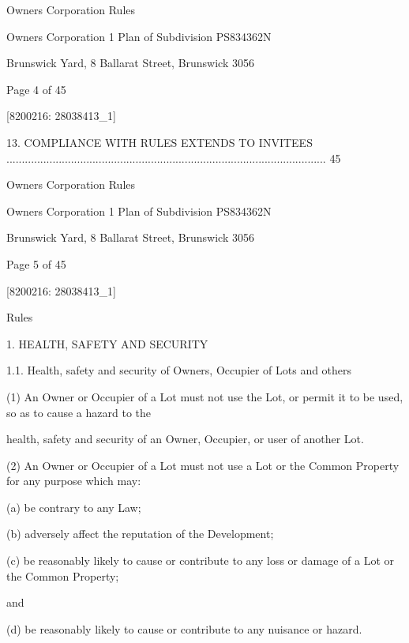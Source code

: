 \documentclass{article}
\begin{document}
{\fontsize{9}{1}Owners Corporation Rules }

{\fontsize{9}{1}Owners Corporation 1 Plan of Subdivision PS834362N }

{\fontsize{9}{1}Brunswick Yard, 8 Ballarat Street, Brunswick 3056 }


{\fontsize{9}{1}Page 4  of 45 }



{\fontsize{7.02}{1}[8200216: 28038413\_1] }

{\fontsize{9.99}{1}13. COMPLIANCE WITH RULES EXTENDS TO INVITEES ........................................................................................................ 45 }

\newpage





{\fontsize{9}{1}Owners Corporation Rules }

{\fontsize{9}{1}Owners Corporation 1 Plan of Subdivision PS834362N }

{\fontsize{9}{1}Brunswick Yard, 8 Ballarat Street, Brunswick 3056 }


{\fontsize{9}{1}Page 5  of 45 }



{\fontsize{7.02}{1}[8200216: 28038413\_1] }

{\fontsize{10.02}{1}Rules }

{\fontsize{9.99}{1}1. HEALTH, SAFETY AND SECURITY }

{\fontsize{9.99}{1}1.1. Health, safety and security of Owners, Occupier of Lots and others }

{\fontsize{9.962}{1}(1) An Owner or Occupier of a Lot must not use the Lot, or permit it to be used, so as to cause a hazard to the }

{\fontsize{10.02}{1}health, safety and security of an Owner, Occupier, or user of another Lot. }

{\fontsize{9.962}{1}(2) An Owner or Occupier of a Lot must not use a Lot or the Common Property for any purpose which may: }

{\fontsize{9.962}{1}(a) be contrary to any Law; }

{\fontsize{9.962}{1}(b) adversely affect the reputation of the Development;  }

{\fontsize{9.962}{1}(c) be reasonably likely to cause or contribute to any loss or damage of a Lot or the Common Property; }

{\fontsize{10.02}{1}and }

{\fontsize{9.962}{1}(d) be reasonably likely to cause or contribute to any nuisance or hazard. }
\end{document}
